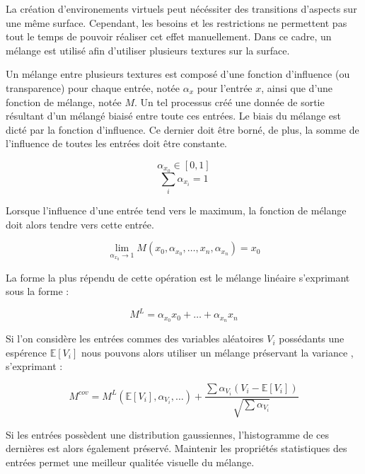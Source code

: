 \documentclass[9pt, twocolumn]{article} %
\begin{document}
La création d'environements virtuels peut nécéssiter des transitions d'aspects
sur une même surface. Cependant, les besoins et les restrictions ne permettent
pas tout le temps de pouvoir réaliser cet effet manuellement. Dans ce cadre, un
mélange est utilisé afin d'utiliser plusieurs textures sur la surface.

Un mélange entre plusieurs textures est composé d'une fonction d'influence (ou
transparence) pour chaque entrée, notée $\alpha_x$ pour l'entrée $x$, ainsi que
d'une fonction de mélange, notée $M$. Un tel processus créé une donnée de
sortie résultant d'un mélangé biaisé entre toute ces entrées. Le biais du
mélange est dicté par la fonction d'influence. Ce dernier doit être borné, de
plus, la somme de l'influence de toutes les entrées doit être constante.

\begin{equation}\label{AlphaBorne}
  \alpha_{x_0} \in [0, 1]
\end{equation}
\begin{equation}\label{AlphaConstant}
  \sum_i \alpha_{x_i} = 1
\end{equation}

Lorsque l'influence d'une entrée tend vers le maximum, la fonction de mélange
doit alors tendre vers cette entrée.

\begin{equation}\label{MixLimit}
  \lim_{\alpha_{x_0} \rightarrow 1} M(x_0, \alpha_{x_0}, \dots , x_n, \alpha_{x_n}) = x_0
\end{equation}

La forme la plus répendu de cette opération est le mélange linéaire s'exprimant
sous la forme :

\begin{equation}\label{MixLinear}
  M^{L} = \alpha_{x_0} x_0 + \dots + \alpha_{x_n} x_n
\end{equation}

Si l'on considère les entrées commes des variables aléatoires $V_i$ possédants
une espérence $ \mathbb{E}[V_i] $ nous pouvons alors utiliser un mélange
préservant la variance \cite{HPnoise}, s'exprimant :

\begin{equation}\label{MixVariancePreserving}
  M^{cov}
  =
  M^{L}(\mathbb{E}[V_i], \alpha_{V_i}, \dots) + \frac {\sum \alpha_{V_i}(V_i
    - \mathbb{E}[V_i])} {\sqrt{\sum \alpha_{V_i}}}
\end{equation}

Si les entrées possèdent une distribution gaussiennes, l'histogramme de ces
dernières est alors également préservé. Maintenir les propriétés statistiques
des entrées permet une meilleur qualitée visuelle du mélange.
\end{document}
